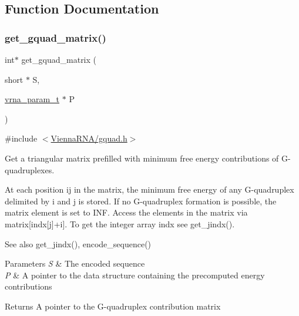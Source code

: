 \subsection{Function Documentation}
\mbox{\label{group__gquads_ga392e45c9615aa123737671603fa4203c}} 
\subsubsection{\texorpdfstring{get\+\_\+gquad\+\_\+matrix()}{get\_gquad\_matrix()}}
{\footnotesize\ttfamily int$\ast$ get\+\_\+gquad\+\_\+matrix (\begin{DoxyParamCaption}\item[{short $\ast$}]{S,  }\item[{\hyperlink{group__energy__parameters_ga8a69ca7d787e4fd6079914f5343a1f35}{vrna\+\_\+param\+\_\+t} $\ast$}]{P }\end{DoxyParamCaption})}



{\ttfamily \#include $<$\hyperlink{gquad_8h}{Vienna\+R\+N\+A/gquad.\+h}$>$}



Get a triangular matrix prefilled with minimum free energy contributions of G-\/quadruplexes. 

At each position ij in the matrix, the minimum free energy of any G-\/quadruplex delimited by i and j is stored. If no G-\/quadruplex formation is possible, the matrix element is set to I\+NF. Access the elements in the matrix via matrix\mbox{[}indx\mbox{[}j\mbox{]}+i\mbox{]}. To get the integer array indx see get\+\_\+jindx().

\begin{DoxySeeAlso}{See also}
get\+\_\+jindx(), encode\+\_\+sequence()
\end{DoxySeeAlso}

\begin{DoxyParams}{Parameters}
{\em S} & The encoded sequence \\
\hline
{\em P} & A pointer to the data structure containing the precomputed energy contributions \\
\hline
\end{DoxyParams}
\begin{DoxyReturn}{Returns}
A pointer to the G-\/quadruplex contribution matrix 
\end{DoxyReturn}
\mbox{\label{group__gquads_gae41763215b9c64d2a7b67f0df8a28078}} 
